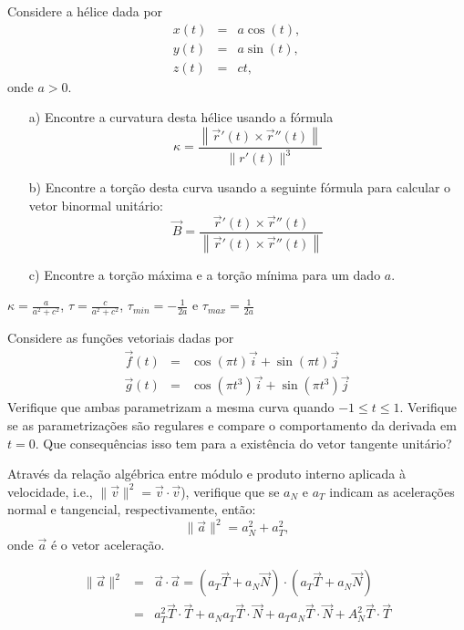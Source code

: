 \begin{exer} Considere a hélice dada por
\begin{eqnarray*}
x(t)&=&a\cos(t),\\
y(t)&=&a\sin(t),\\
z(t)&=&ct,
\end{eqnarray*}
onde $a>0$.
\begin{itemize}
\item[a)] Encontre  a curvatura desta hélice usando a fórmula
$$\kappa=\frac{\left\|\vec{r}'(t)\times \vec{r}''(t)\right\|}{\|r'(t)\|^3}$$
\item[b)] Encontre a torção desta curva usando a seguinte fórmula para calcular o vetor binormal unitário: $$\vec{B}=\frac{\vec{r}'(t)\times \vec{r}''(t)}{\left\|\vec{r}'(t)\times \vec{r}''(t)\right\|}$$
\item[c)] Encontre a torção máxima e a torção mínima para um dado $a$.
\end{itemize}
\end{exer}
\begin{resp}
 $\kappa= \frac{a}{a^2+c^2}$, $\tau = \frac{c}{a^2+c^2}$, $\tau_{min} = -\frac{1}{2a}$ e $\tau_{max} = \frac{1}{2a}$
\end{resp}


\begin{exer}
Considere as funções vetoriais dadas por
\begin{eqnarray*}
\vec{f}(t)&=&\cos(\pi t)\vec{i}+\sin(\pi t)\vec{j}\\
\vec{g}(t)&=&\cos(\pi t^3)\vec{i}+\sin(\pi t^3)\vec{j}
\end{eqnarray*}
Verifique que ambas parametrizam a mesma curva quando $-1\leq t \leq 1$. Verifique se as parametrizações são regulares e compare o comportamento da derivada em $t=0$. Que consequências isso tem para a existência do vetor tangente unitário?
\end{exer}



\begin{exer} Através da relação algébrica entre módulo e produto interno aplicada à velocidade, i.e., $\|\vec{v}\|^2=\vec{v}\cdot\vec{v}$), verifique que se $a_N$ e $a_T$ indicam as acelerações normal e tangencial, respectivamente, então:
$$\|\vec{a}\|^2=a_N^2+a_T^2,$$
onde $\vec{a}$ é o vetor aceleração.
\end{exer}
\begin{resp}
 \begin{eqnarray}
\|\vec{a}\|^2&=&\vec{a}\cdot\vec{a}=\left(a_T\vec{T}+a_N\vec{N}\right)\cdot\left(a_T\vec{T}+a_N\vec{N}\right)\\
&=&a_T^2\vec{T}\cdot\vec{T}+a_Na_T\vec{T}\cdot\vec{N}+a_Ta_N\vec{T}\cdot\vec{N}+A_N^2\vec{T}\cdot\vec{T}
 \end{eqnarray}
\end{resp}


